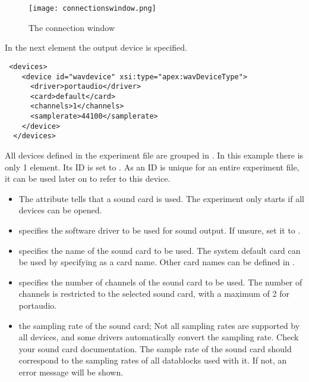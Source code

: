 \begin{figure}
 \centering
\texttt{[image: connectionswindow.png]}
 \caption{The connection window}
 \label{fig:ex1-output}
\end{figure}

In the next element the output device is specified.

\begin{lstlisting}
 <devices>
    <device id="wavdevice" xsi:type="apex:wavDeviceType">
      <driver>portaudio</driver>
      <card>default</card>
      <channels>1</channels>
      <samplerate>44100</samplerate>
    </device>
  </devices>
\end{lstlisting}

All devices defined in the experiment file are grouped in
. In this example there is only 1
 element. Its ID is set to . As an
ID is unique for an entire experiment file, it can be used later
on to refer to this device.

\begin{itemize}
\item  The  attribute tells
\apex that a sound card is used. The experiment only starts if all
devices can be opened.

\item {} specifies the software driver to be used
for sound output. If unsure, set it to .

\item {} specifies the name of the sound card to be
used. The system default card can be used by specifying
 as a card name. Other card names can be defined in
.

\item {} specifies the number of channels of the
sound card to be used. The number of channels is restricted to the
selected sound card, with a maximum of 2 for portaudio.

\item {} the sampling rate of the sound card;
Not all sampling rates are supported by all devices, and some
drivers automatically convert the sampling rate. Check your sound
card documentation. The sample rate of the sound card should
correspond to the sampling rates of all datablocks used with it.
If not, an error message will be shown.

\end{itemize}


